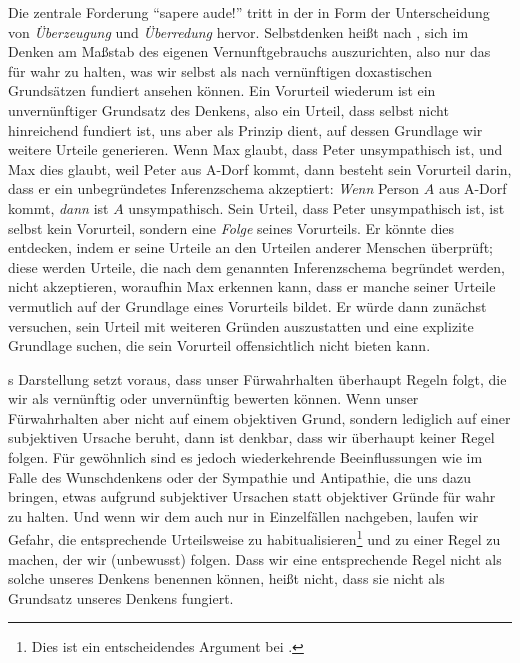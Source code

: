 Die zentrale Forderung \enquote{sapere aude!} tritt in der  in Form der Unterscheidung von \emph{Überzeugung} und
\emph{Überredung} hervor. Selbstdenken heißt nach , sich im
Denken am Maßstab des eigenen Vernunftgebrauchs auszurichten, also nur das für
wahr zu halten, was wir selbst als nach vernünftigen doxastischen Grundsätzen
fundiert ansehen können. Ein Vorurteil wiederum ist ein unvernünftiger Grundsatz
des Denkens, also ein Urteil, dass selbst nicht hinreichend fundiert ist, uns
aber als Prinzip dient, auf dessen Grundlage wir weitere Urteile generieren.
Wenn Max glaubt, dass Peter unsympathisch ist, und Max dies glaubt, weil Peter
aus A-Dorf kommt, dann besteht sein Vorurteil darin, dass er ein unbegründetes
Inferenzschema akzeptiert: \emph{Wenn} Person $A$ aus A-Dorf kommt, \emph{dann}
ist $A$ unsympathisch. Sein Urteil, dass Peter unsympathisch ist, ist selbst
kein Vorurteil, sondern eine \emph{Folge} seines Vorurteils. Er könnte dies
entdecken, indem er seine Urteile an den Urteilen anderer Menschen überprüft;
diese werden Urteile, die nach dem genannten Inferenzschema begründet werden,
nicht akzeptieren, woraufhin Max erkennen kann, dass er manche seiner Urteile
vermutlich auf der Grundlage eines Vorurteils bildet. Er würde dann zunächst
versuchen, sein Urteil mit weiteren Gründen auszustatten und eine explizite
Grundlage suchen, die sein Vorurteil offensichtlich nicht bieten kann.

s Darstellung setzt voraus, dass unser Fürwahrhalten
überhaupt Regeln folgt, die wir als vernünftig oder unvernünftig bewerten können.
Wenn unser Fürwahrhalten aber nicht auf einem objektiven Grund, sondern
lediglich auf einer subjektiven Ursache beruht, dann ist denkbar, dass wir überhaupt keiner
Regel folgen. Für gewöhnlich sind es jedoch wiederkehrende Beeinflussungen wie
im Falle des Wunschdenkens oder der Sympathie und Antipathie, die uns dazu bringen, etwas
aufgrund subjektiver Ursachen statt objektiver Gründe für wahr zu halten. Und
wenn wir dem auch nur in Einzelfällen nachgeben, laufen wir Gefahr, die
entsprechende Urteilsweise zu habitualisieren\footnote{Dies ist ein
entscheidendes Argument bei
\textcite[vgl.][294]{Clifford:TheEthicsofBelief1877}.} und zu einer Regel zu
machen, der wir (unbewusst) folgen. Dass wir eine entsprechende Regel nicht als
solche unseres Denkens benennen können, heißt nicht, dass sie nicht als
Grundsatz unseres Denkens fungiert.

